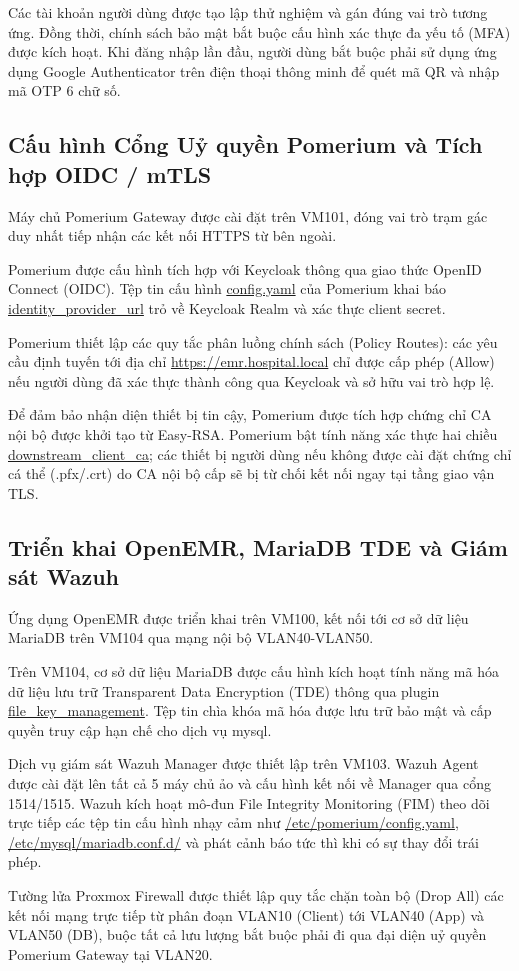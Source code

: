 Các tài khoản người dùng được tạo lập thử nghiệm và gán đúng vai trò tương ứng. Đồng thời, chính sách bảo mật bắt buộc cấu hình xác thực đa yếu tố (MFA) được kích hoạt. Khi đăng nhập lần đầu, người dùng bắt buộc phải sử dụng ứng dụng Google Authenticator trên điện thoại thông minh để quét mã QR và nhập mã OTP 6 chữ số.

\subsection{Cấu hình Cổng Uỷ quyền Pomerium và Tích hợp OIDC / mTLS}

Máy chủ Pomerium Gateway được cài đặt trên VM101, đóng vai trò trạm gác duy nhất tiếp nhận các kết nối HTTPS từ bên ngoài.

Pomerium được cấu hình tích hợp với Keycloak thông qua giao thức OpenID Connect (OIDC). Tệp tin cấu hình \url{config.yaml} của Pomerium khai báo \url{identity_provider_url} trỏ về Keycloak Realm và xác thực client secret.

Pomerium thiết lập các quy tắc phân luồng chính sách (Policy Routes): các yêu cầu định tuyến tới địa chỉ \url{https://emr.hospital.local} chỉ được cấp phép (Allow) nếu người dùng đã xác thực thành công qua Keycloak và sở hữu vai trò hợp lệ.

Để đảm bảo nhận diện thiết bị tin cậy, Pomerium được tích hợp chứng chỉ CA nội bộ được khởi tạo từ Easy-RSA. Pomerium bật tính năng xác thực hai chiều \url{downstream_client_ca}; các thiết bị người dùng nếu không được cài đặt chứng chỉ cá thể (.pfx/.crt) do CA nội bộ cấp sẽ bị từ chối kết nối ngay tại tầng giao vận TLS.

\subsection{Triển khai OpenEMR, MariaDB TDE và Giám sát Wazuh}

Ứng dụng OpenEMR được triển khai trên VM100, kết nối tới cơ sở dữ liệu MariaDB trên VM104 qua mạng nội bộ VLAN40-VLAN50.

Trên VM104, cơ sở dữ liệu MariaDB được cấu hình kích hoạt tính năng mã hóa dữ liệu lưu trữ Transparent Data Encryption (TDE) thông qua plugin \url{file_key_management}. Tệp tin chìa khóa mã hóa được lưu trữ bảo mật và cấp quyền truy cập hạn chế cho dịch vụ mysql.

Dịch vụ giám sát Wazuh Manager được thiết lập trên VM103. Wazuh Agent được cài đặt lên tất cả 5 máy chủ ảo và cấu hình kết nối về Manager qua cổng 1514/1515. Wazuh kích hoạt mô-đun File Integrity Monitoring (FIM) theo dõi trực tiếp các tệp tin cấu hình nhạy cảm như \url{/etc/pomerium/config.yaml}, \url{/etc/mysql/mariadb.conf.d/} và phát cảnh báo tức thì khi có sự thay đổi trái phép.

Tường lửa Proxmox Firewall được thiết lập quy tắc chặn toàn bộ (Drop All) các kết nối mạng trực tiếp từ phân đoạn VLAN10 (Client) tới VLAN40 (App) và VLAN50 (DB), buộc tất cả lưu lượng bắt buộc phải đi qua đại diện uỷ quyền Pomerium Gateway tại VLAN20.
